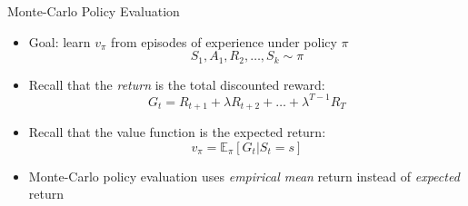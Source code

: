 \bgroup
\begin{frame}{Monte-Carlo Policy Evaluation}
\begin{itemize}
\item Goal: learn $v_{\pi}$ from episodes of experience under policy $\pi$
\begin{equation*}
S_1, A_1, R_2, \ldots, S_k \sim \pi
\end{equation*}
\item Recall that the \emph{return} is the total discounted reward:
\begin{equation*}
G_t = R_{t+1} + \lambda R_{t+2}+\ldots+\lambda^{T-1}R_T
\end{equation*}
\item Recall that the value function is the expected return:
\begin{equation*}
v_{\pi} = \mathbb{E}_{\pi}[G_t | S_t = s]
\end{equation*}
\item Monte-Carlo policy evaluation uses \emph{empirical mean} return instead of \emph{expected} return
\end{itemize}
\end{frame}
\egroup
